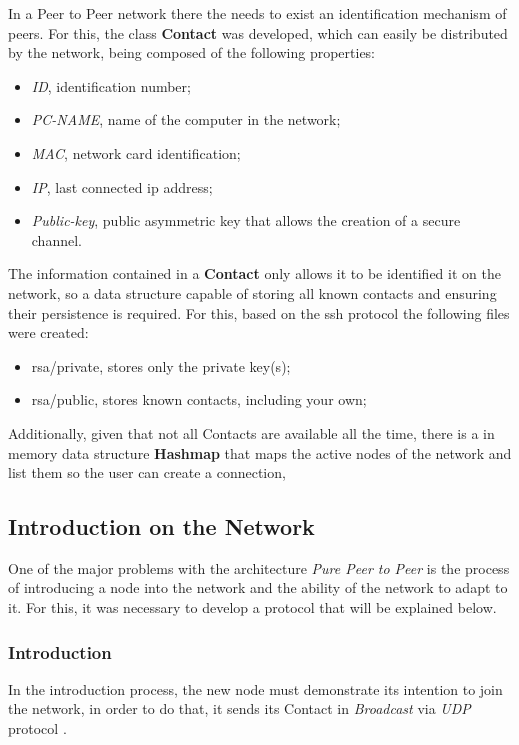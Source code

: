 \documentclass[extendedabs]{recpad2k}
\begin{document}
In a Peer to Peer network there the needs to exist an identification mechanism of peers. For this, the class {\bf Contact} was developed, which can easily be distributed by the network, being composed of the following properties:

\begin{itemize}
  \item {\em ID}, identification number;
  \item {\em PC-NAME}, name of the computer in the network;
  \item {\em MAC}, network card identification;
  \item {\em IP}, last connected ip address;
  \item {\em Public-key}, public asymmetric key that allows the creation of a secure channel.
\end{itemize}
The information contained in a {\bf Contact} only allows it to be identified it on the network, so a data structure capable of storing all known contacts and ensuring their persistence is required.
For this, based on the ssh protocol the following files were created:

\begin{itemize}
  \item rsa/private,  stores only the private key(s);
  \item rsa/public, stores known contacts, including your own;
 
\end{itemize}

Additionally, given that not all Contacts are available all the time, there is a in memory data structure {\bf Hashmap} that maps the active nodes of the network and list them so the user can create a connection,


\subsection{Introduction on the Network}
One of the major problems with the architecture {\em  Pure Peer to Peer} is the process of introducing a node into the network and the ability of the network to adapt to it. For this, it was necessary to develop a protocol that will be explained below.

\subsubsection{Introduction}
In the introduction process, the new node must demonstrate its intention to join the network, in order to do that, it sends its Contact in {\em Broadcast} via {\em UDP} protocol .
\end{document}
